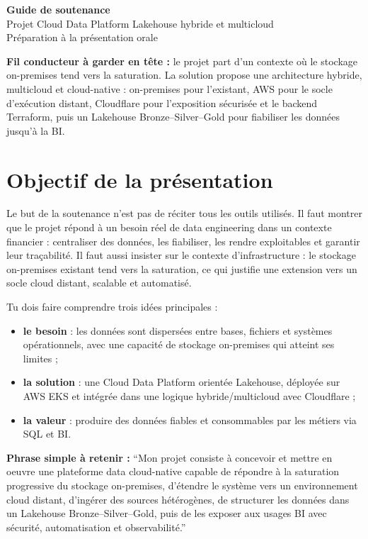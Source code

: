 \documentclass[11pt,a4paper]{article}
\newcommand{\important}[1]{%
  \vspace{0.25cm}
  \noindent
  \colorbox{softblue}{%
    \parbox{\dimexpr\textwidth-2\fboxsep\relax}{#1}%
  }
  \vspace{0.2cm}
}
\begin{document}
\begin{center}
{\Huge\bfseries Guide de soutenance}\\[0.25cm]
{\Large Projet Cloud Data Platform Lakehouse hybride et multicloud}\\[0.35cm]
{\large Préparation à la présentation orale}
\end{center}

\vspace{0.5cm}

\important{
\textbf{Fil conducteur à garder en tête :}
le projet part d'un contexte où le stockage on-premises tend vers la saturation. La solution propose une architecture hybride, multicloud et cloud-native : on-premises pour l'existant, AWS pour le socle d'exécution distant, Cloudflare pour l'exposition sécurisée et le backend Terraform, puis un Lakehouse Bronze--Silver--Gold pour fiabiliser les données jusqu'à la BI.
}

\tableofcontents
\newpage

\section{Objectif de la présentation}

Le but de la soutenance n'est pas de réciter tous les outils utilisés. Il faut montrer que le projet répond à un besoin réel de data engineering dans un contexte financier : centraliser des données, les fiabiliser, les rendre exploitables et garantir leur traçabilité. Il faut aussi insister sur le contexte d'infrastructure : le stockage on-premises existant tend vers la saturation, ce qui justifie une extension vers un socle cloud distant, scalable et automatisé.

Tu dois faire comprendre trois idées principales :
\begin{itemize}
  \item \textbf{le besoin} : les données sont dispersées entre bases, fichiers et systèmes opérationnels, avec une capacité de stockage on-premises qui atteint ses limites ;
  \item \textbf{la solution} : une Cloud Data Platform orientée Lakehouse, déployée sur AWS EKS et intégrée dans une logique hybride/multicloud avec Cloudflare ;
  \item \textbf{la valeur} : produire des données fiables et consommables par les métiers via SQL et BI.
\end{itemize}

\important{
\textbf{Phrase simple à retenir :}
``Mon projet consiste à concevoir et mettre en oeuvre une plateforme data cloud-native capable de répondre à la saturation progressive du stockage on-premises, d'étendre le système vers un environnement cloud distant, d'ingérer des sources hétérogènes, de structurer les données dans un Lakehouse Bronze--Silver--Gold, puis de les exposer aux usages BI avec sécurité, automatisation et observabilité.''
}
\end{document}
